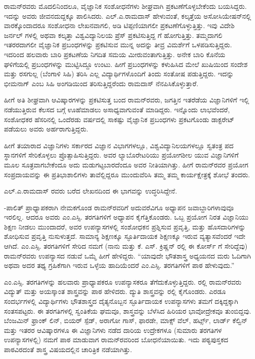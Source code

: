 ರಾಮನ್‍ರವರು ಮೊದಲಿನಿಂದಲೂ, ವೈಜ್ಞಾನಿಕ ಸಂಶೋಧನೆಗಳು ಶೀಘ್ರವಾಗಿ ಪ್ರಕಟಣೆಗೊಳ್ಳಬೇಕೆಂದು ಬಯಸಿದ್ದರು. ಇದನ್ನು ಅವರು ಜೀವನದುದ್ದಕ್ಕೂ ಪಾಲಿಸಿದರು. ಎಲ್.ಎ.ರಾಮದಾಸ್ ಹೇಳುವಂತೆ, ಕಲ್ಕತ್ತೆಯ ಅಸೋಸಿಯೇಷನ್‍ನಲ್ಲಿ ವಾರಕ್ಕೊಂದಾದರೂ ಸಂಶೋಧನಾ ಲೇಖನವಾಗಲಿ, ಅಡಿ ಟಿಪ್ಪಣಿಯಾಗಲೀ ಪ್ರಕಟಣೆಗೊಳ್ಳುತ್ತಿತ್ತು. ಇವು ವಿದೇಶಿ ಜರ್ನಲ್ ಗಳಲ್ಲಿ ಅಥವಾ ಕಲ್ಕತ್ತಾ ವಿಶ್ವವಿದ್ಯಾನಿಲಯ ಪ್ರೆಸ್ ಪ್ರಕಟಿಸುತ್ತಿದ್ದ \textit{}ಗೆ ಹೋಗುತ್ತಿತ್ತು. ತಮ್ಮದಾಗಲಿ ಇತರರದಾಗಲೀ ವೈಜ್ಞಾನಿಕ ಪ್ರಬಂಧಗಳನ್ನು ಪ್ರಕಟಿಸುವ ಮುನ್ನ ಅದನ್ನು ತೀವ್ರ ವಿಮರ್ಶೆಗೆ ಒಳಪಡಿಸುತ್ತಿದ್ದರು. ಇದರಿಂದ ಹಲವಾರು ಬಾರಿ ಪ್ರಕಟಣೆಯ ನಿಗದಿತ ಸಮಯ ಮೀರುವಂತಾಗುತ್ತಿತ್ತು. ಅನೇಕ ಬಾರಿ ಕೊನೆಯ ಘಳಿಗೆಯಲ್ಲಿ ಪ್ರಬಂಧಗಳನ್ನು ಮುಟ್ಟಿಸಿದ್ದೂ ಉಂಟು. ಹೀಗೆ ಪ್ರಬಂಧಗಳನ್ನು ಕಳುಹಿಸಿದ ಮೇಲೆ ಖುಷಿಯಿಂದ ಸಂದೇಶ ಮತ್ತು ರಸಗುಲ್ಲ (ಬೆಂಗಾಳಿ ಸಿಹಿ) ತರಿಸಿ ಎಲ್ಲ ವಿದ್ಯಾರ್ಥಿಗಳೊಂದಿಗೆ ತಿಂದು ಸಂತೋಷ ಪಡುತ್ತಿದ್ದರು. ಇದನ್ನು ಭೀಮನಾಗ್ ಎಂಬ ಸಿಹಿ ಅಂಗಡಿಯಿಂದ ತರಿಸುತ್ತಿದ್ದರೆಂದು ರಾಮದಾಸ್ ನೆನಪಿಸಿಕೊಳ್ಳುತ್ತಾರೆ.

ಹೀಗೆ ಅತಿ ಶೀಘ್ರವಾಗಿ ಆವಿಷ್ಕಾರಗಳನ್ನು ಪ್ರಕಟಿಸುತ್ತ ಬಂದ ರಾಮನ್‍ರವರು, ಜಗತ್ತಿನ ಇತರೆಡೆಯ ವಿಜ್ಞಾನಿಗಳಿಗೆ ಇಲ್ಲಿ ನಡೆಯುತ್ತಿರುವ ಕೆಲಸದ ಬಗ್ಗೆ ಊಹೆಮಾಡಲು ಅಸಾಧ್ಯವಾಗುವಂತೆ ಮಾಡಿದ್ದರು. ಇನ್ನೊಂದು ಲಾಭವೆಂದರೆ, ಸಂಶೋಧಕರ ಹೆಸರಿನಲ್ಲಿ ಒಂದೆರಡು ವರ್ಷದಲ್ಲಿ ಸಾಕಷ್ಟು ವೈಜ್ಞಾನಿಕ ಪ್ರಬಂಧಗಳು ಪ್ರಕಟಗೊಂಡು ಡಾಕ್ಟರೇಟ್ ಪಡೆಯಲು ಅವರು ಅರ್ಹರಾಗುತ್ತಿದ್ದರು.

ಹೀಗೆ ತಯಾರಾದ ವಿಜ್ಞಾನಿಗಳು ಸರ್ಕಾರದ ವಿಜ್ಞಾನ ವಿಭಾಗಗಳಲ್ಲೂ, ವಿಶ್ವವಿದ್ಯಾನಿಲಯಗಳಲ್ಲೂ ಸ್ವತಂತ್ರ ಪದ ಸ್ಥಾನಗಳಿಗೆ ಸೇರಿಕೊಳ್ಳಲು ಪ್ರೊತ್ಸಾಹಿಸುತ್ತಿದ್ದರು. ಅವರ ಲ್ಯಾಬೊರೇಟರಿಯು ಪ್ರಯೋಗಶೀಲ ಯುವ ವಿಜ್ಞಾನಿಗಳಿಗೆ ಮೂಲ ಸೂತ್ರವಾಗಬೇಕೆಂದೂ ಅದು ಮಡುಗಟ್ಟಬಾರದೆಂದೂ ಅವರ ನೀತಿಯಾಗಿತ್ತು. ಹೀಗೆ ರಾಮನ್‍ರವರ ಪ್ರಯೋಗ ಸಂಪ್ರದಾಯವನ್ನು ಈ ಪ್ರತಿಭಾಶಾಲಿಗಳು ತಾವೆಲ್ಲಿದ್ದರೂ ಮುಂದುವೆರಿಸಿ ತಮ್ಮ ತಮ್ಮ ಕಾರ್ಯಕ್ಷೇತ್ರಕ್ಕೆ ಶೋಭೆ ತಂದರು.



ಎಲ್.ಎ.ರಾಮದಾಸ್ ರವರು ಬರೆದ ಲೇಖನದಿಂದ ಈ ಭಾಗವನ್ನು ಉದ್ಧರಿಸಿದ್ದೇನೆ.

-ಪಾಲಿತ್ ಪ್ರಾಧ್ಯಾಪಕರಾಗಿ ನೇಮಕಗೊಂಡ ರಾಮನ್‍ರವರಿಗೆ ಅದುವರೆವಿಗೂ ಅಧ್ಯಾಪನ ಜವಾಬ್ದಾರಿಗಳಾವುವೂ ಇರಲಿಲ್ಲ. ಆದರೂ ಅವರು ಎಂ.ಎಸ್ಸಿ. ತರಗತಿಗಳಿಗೆ ಅಧ್ಯಾಪನ ಕೈಗೆತ್ತಿಕೊಂಡರು. ಒಬ್ಬ ಪ್ರಯೋಗ ನಿರತ ವಿಜ್ಞಾನಿಯು ಶಿಕ್ಷಣ ನೀಡಲು ಮುಂದಾದರೆ, ಅವರ ಉಪನ್ಯಾಸಗಳಲ್ಲಿ ಸಂಶೋಧಕನ ಪ್ರಶ್ನಿಸುವ ಪ್ರವೃತ್ತಿ, ಮತ್ತು ಹೊಸದಾರಿಗಳನ್ನು ಶೋಧಿಸುವ ಪ್ರವೃತ್ತಿ ನುಸುಳುತ್ತದೆ. ಸಾಮಾನ್ಯ ಶಿಕ್ಷಣಕ್ಕೂ ಸ್ಫೂರ್ತಿದಾಯಕ ಶಿಕ್ಷಣಕ್ಕೂ ಇರುವ ವ್ಯತ್ಯಾಸವೆಂದರೆ ಇದೇ ಆಗಿದೆ. ಎಂ.ಎಸ್ಸಿ. ತರಗತಿಗಳಿಗೆ ಸೇರಿದ ನಮಗೆ (ನಾನು ಮತ್ತು ಕೆ. ಎಸ್. ಕ್ರಿಷ್ಣನ್ ರಲ್ಲಿ ಈ ಕೋರ್ಸ್ ಗೆ ಸೇರಿದ್ದೆವು) ರಾಮನ್‍ರವರು ಉಪನ್ಯಾಸದ ನಡುವೆ ಒಮ್ಮೆ ಹೀಗೆ ಹೇಳಿದ್ದರು. “ಯಾವುದೇ ಭೌತಶಾಸ್ತ್ರ ಅಧ್ಯಯನದ ಮರು ಓದಿಗಾಗಿ ಅಥವಾ ಅದರ ತಥ್ಯ ಗ್ರಹಿಕೆಗಾಗಿ ಇರುವ ಒಳ್ಳೆಯ ಹಾದಿಯೆಂದರೆ ಎಂ.ಎಸ್ಸಿ. ತರಗತಿಗಳಿಗೆ ಪಾಠ ಹೇಳುವುದು.”

ಎಂ.ಎಸ್ಸಿ. ತರಗತಿಗಳನ್ನು ಹಲವಾರು ಪ್ರಾಧ್ಯಾಪಕರೂ ಉಪನ್ಯಾಸಕರೂ ತೆಗೆದುಕೊಳ್ಳುತ್ತಿದ್ದರು. ರಲ್ಲಿ ರಾಮನ್‍ರವರು ವಿದ್ಯುತ್ ಮತ್ತು ಅಯಸ್ಕಾಂತ ಶಾಸ್ತ್ರವನ್ನು ಪಾಠ ಹೇಳಿದರು. ದ್ಯುತಿ ಶಾಸ್ತ್ರವನ್ನು ರಲ್ಲಿ ಕೈಗೊಂಡರು. ಎರಡೂ ಸಂದರ್ಭಗಳಲ್ಲಿ ವಿದ್ಯಾರ್ಥಿಗಳು ಭೌತಶಾಸ್ತ್ರದ ದೈತ್ಯನೊಬ್ಬನ ಸ್ಫೂರ್ತಿದಾಯಕ ಉಪನ್ಯಾಸಗಳು ತಮಗೆ ದಕ್ಕಿದ್ದಕ್ಕಾಗಿ ಸಂತಸಪಟ್ಟರು. ಈ ತರಗತಿಗಳಲ್ಲಿ ಸ್ವಂತಿಕೆಯ ಘಮವೂ, ಶಾಸ್ತ್ರವನ್ನು ಬೆಳೆಸಿದ ಹಿರಿಯರ ಭಾವೋದ್ರೇಕವೂ ತುಂಬಿದ್ದವು. ಬೆಂಜಮಿನ್ ಫ್ರಾಂಕ್ ಲಿನ್, ಬಿಯರ್ ಸ್ಪೆಡ್, ಅರಾಗೋ ಗಾಸ್, ಫಾರಡೇ, ಮಾಕ್ಸ್ ವೆಲ್, ಹರ್ಟ್ಸ್, ಲಾರ್ಡ್ ಕೆಲ್ವಿನ್ ಮತ್ತು ಇತರರ ಆವಿಷ್ಕಾರಗಳೂ ಈ ವಿಜ್ಞಾನಿಗಳು ನಡೆದ ದಾರಿಯ ಉದ್ರೇಕಗಳೂ (ಸುಮಾರು  ತರಗತಿಗಳ ಉಪನ್ಯಾಸಗಳಲ್ಲಿ) ನಮಗೆ \textit{} ಪಾಠ ಮಾಡುವಾಗ ರಾಮನ್‍ರವರಿಂದ ಬೋಧನೆಯಾಯಿತು. ಇದು ಪಠ್ಯಪುಸ್ತಕದ ಪಾಠವಿರದಂತೆ ಶಾಸ್ತ್ರ ವಿಷಯದಲ್ಲಿನ ಚಾರಿತ್ರಿಕ ನಡೆಯಾಗಿತ್ತು.


